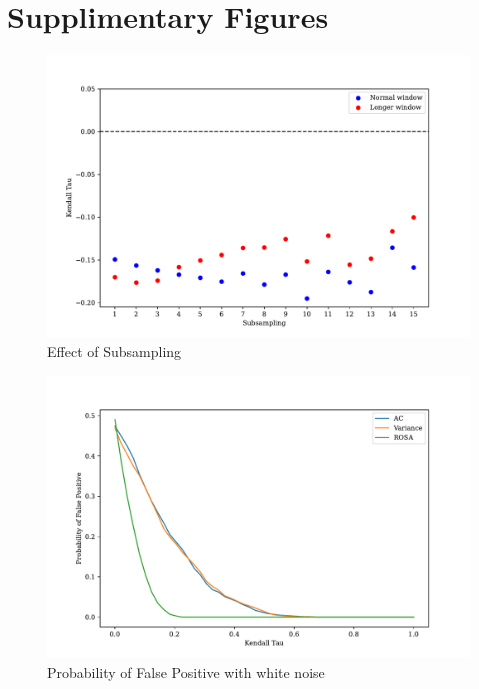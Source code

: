\section{Supplimentary Figures}
\begin{figure}
  \centering
  \includegraphics[width=\textwidth]{subsampling}
  \caption[Effect of Subsampling]{Effect of Subsampling}
  \label{fig:subsampling}
\end{figure}
\begin{figure}
  \centering
  \includegraphics[width=\textwidth]{false_positives_whitenoise}
  \caption[False positive with white noise]{Probability of False Positive with white noise}
  \label{fig:false_positives_white}
\end{figure}
